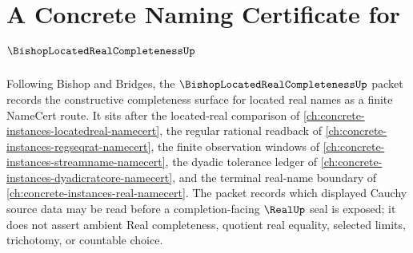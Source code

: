 \chapter{A Concrete Naming Certificate for $\BishopLocatedRealCompletenessUp$}
\label{ch:concrete-instances-bishop-located-real-completeness-namecert}

Following Bishop and Bridges, the $\BishopLocatedRealCompletenessUp$ packet records the constructive completeness surface for located real names as a finite NameCert route. It sits after the located-real comparison of \autoref{ch:concrete-instances-locatedreal-namecert}, the regular rational readback of \autoref{ch:concrete-instances-regseqrat-namecert}, the finite observation windows of \autoref{ch:concrete-instances-streamname-namecert}, the dyadic tolerance ledger of \autoref{ch:concrete-instances-dyadicratcore-namecert}, and the terminal real-name boundary of \autoref{ch:concrete-instances-real-namecert}. The packet records which displayed Cauchy source data may be read before a completion-facing $\RealUp$ seal is exposed; it does not assert ambient Real completeness, quotient real equality, selected limits, trichotomy, or countable choice.

